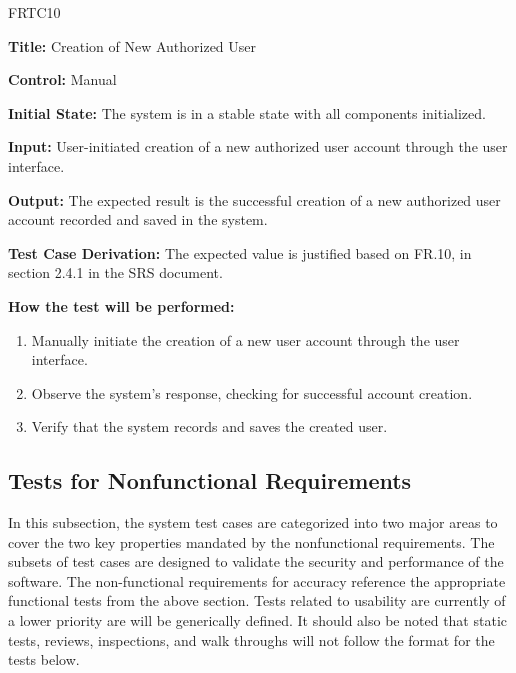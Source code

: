 \documentclass[12pt, titlepage]{article}
\begin{document}
\begin{itemize}
    \begin{item}
        FRTC10
        \begin{mdframed}[linewidth=0.5mm]
            \textbf{Title:} Creation of New Authorized User \par
            \textbf{Control:} Manual \par
            \textbf{Initial State:} The system is in a stable state with all components initialized. \par
            \textbf{Input:} User-initiated creation of a new authorized user account through the user interface. \par
            \textbf{Output:} The expected result is the successful creation of a new authorized user account recorded and saved in the system. \par
            \textbf{Test Case Derivation:} The expected value is justified based on FR.10, in section 2.4.1 in the SRS document. \par
            \textbf{How the test will be performed:}
            \begin{enumerate}[noitemsep]
                \item Manually initiate the creation of a new user account through the user interface.
                \item Observe the system's response, checking for successful account creation.
                \item Verify that the system records and saves the created user.
            \end{enumerate}
        \end{mdframed}
    \end{item}
\end{itemize}

\pagebreak
\subsection{Tests for Nonfunctional Requirements}
In this subsection, the system test cases are categorized into two major areas to cover the two key properties mandated by the nonfunctional requirements. The subsets of test cases are designed to validate the security and performance of the software. The non-functional requirements for accuracy reference the appropriate functional tests from the above section. Tests related to usability are currently of a lower priority are will be generically defined. It should also be noted that static tests, reviews, inspections, and walk throughs will not follow the format for the tests below.
\end{document}
